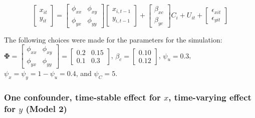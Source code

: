 \documentclass[
]{interact}
\begin{document}
\[
\begin{bmatrix}
x_{it}\\
y_{it}
\end{bmatrix}
=
\begin{bmatrix}
\phi_{xx} & \phi_{xy}\\
\phi_{yx} & \phi_{yy}
\end{bmatrix}
\begin{bmatrix}
x_{i,t-1}\\
y_{i,t-1}
\end{bmatrix}
+
\begin{bmatrix}
\beta_{xc}\\
\beta_{yc}
\end{bmatrix}
C_{i} +
U_{it} +
\begin{bmatrix}
\epsilon_{xit}\\
\epsilon_{yit}
\end{bmatrix}
\]

The following choices were made for the parameters for the simulation:
\(\boldsymbol{\Phi} = \begin{bmatrix} \phi_{xx} & \phi_{xy}\\ \phi_{yx} & \phi_{yy} \end{bmatrix} = \begin{bmatrix} 0.2 & 0.15\\ 0.1 & 0.3 \end{bmatrix}\),
\(\beta_{c} = \begin{bmatrix} 0.10\\0.12 \end{bmatrix}\),
\(\psi_u = 0.3\), \(\psi_x = \psi_y = 1 - \psi_u = 0.4\), and
\(\psi_C = 5\).

\hypertarget{one-confounder-time-stable-effect-for-x-time-varying-effect-for-y-model-2}{%
\subsubsection{\texorpdfstring{One confounder, time-stable effect for
\(x\), time-varying effect for \(y\) (Model
2)}{One confounder, time-stable effect for x, time-varying effect for y (Model 2)}}\label{one-confounder-time-stable-effect-for-x-time-varying-effect-for-y-model-2}}
\end{document}
